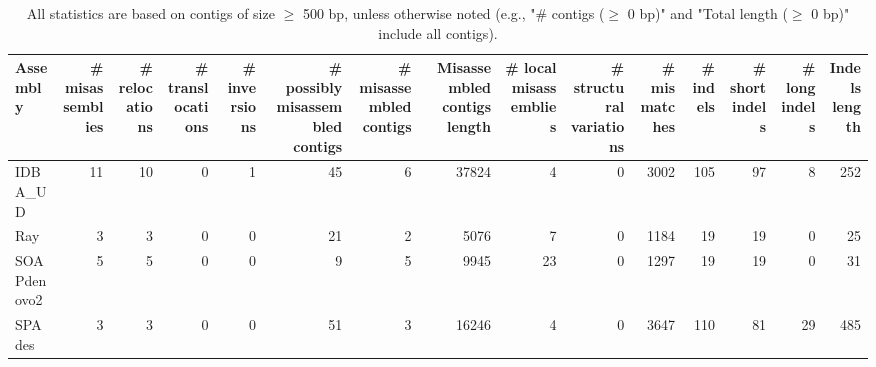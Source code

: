 \documentclass[12pt,a4paper]{article}
\begin{document}
\begin{table}[ht]
\begin{center}
\caption{All statistics are based on contigs of size $\geq$ 500 bp, unless otherwise noted (e.g., "\# contigs ($\geq$ 0 bp)" and "Total length ($\geq$ 0 bp)" include all contigs).}
\begin{tabular}{|l*{14}{|r}|}
\hline
Assembly & \# misassemblies &     \# relocations &     \# translocations &     \# inversions & \# possibly misassembled contigs & \# misassembled contigs & Misassembled contigs length & \# local misassemblies & \# structural variations & \# mismatches & \# indels &     \# short indels &     \# long indels & Indels length \\ \hline
IDBA\_UD & 11 & 10 & 0 & 1 & 45 & 6 & 37824 & 4 & 0 & 3002 & 105 & 97 & 8 & 252 \\ \hline
Ray & 3 & 3 & 0 & 0 & 21 & 2 & 5076 & 7 & 0 & 1184 & 19 & 19 & 0 & 25 \\ \hline
SOAPdenovo2 & 5 & 5 & 0 & 0 & 9 & 5 & 9945 & 23 & 0 & 1297 & 19 & 19 & 0 & 31 \\ \hline
SPAdes & 3 & 3 & 0 & 0 & 51 & 3 & 16246 & 4 & 0 & 3647 & 110 & 81 & 29 & 485 \\ \hline
\end{tabular}
\end{center}
\end{table}
\end{document}
